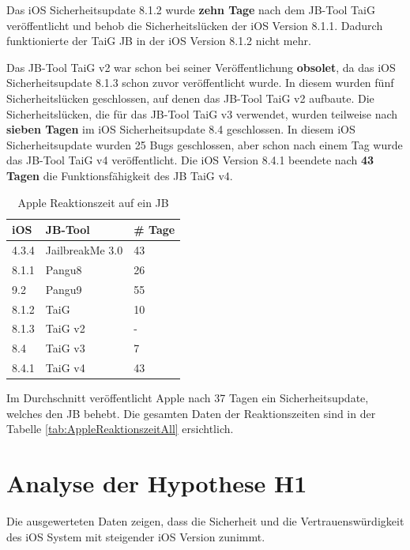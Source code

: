 Das iOS Sicherheitsupdate 8.1.2 wurde \textbf{zehn Tage} nach dem JB-Tool TaiG veröffentlicht und behob die Sicherheitslücken der iOS Version 8.1.1. Dadurch funktionierte der TaiG JB in der iOS Version 8.1.2 nicht mehr.

Das JB-Tool TaiG v2 war schon bei seiner Veröffentlichung \textbf{obsolet}, da das iOS Sicherheitsupdate 8.1.3 schon zuvor veröffentlicht wurde. In diesem wurden fünf Sicherheitslücken geschlossen, auf denen das JB-Tool TaiG v2 aufbaute.
Die Sicherheitslücken, die für das JB-Tool TaiG v3 verwendet, wurden teilweise nach \textbf{sieben Tagen} im iOS Sicherheitsupdate 8.4 geschlossen. In diesem iOS Sicherheitsupdate wurden 25 Bugs geschlossen, aber schon nach einem Tag wurde das JB-Tool TaiG v4 veröffentlicht. Die iOS Version 8.4.1 beendete nach \textbf{43 Tagen} die Funktionsfähigkeit des JB TaiG v4.

\begin{table}[htp!]
    \begin{center}
        \begin{tabular}{| p{10mm} | p{40mm} | p{17mm} |} \hline
            \textbf{iOS} & \textbf{JB-Tool} & \textbf{\# Tage} \\ \hline 
                4.3.4 & JailbreakMe 3.0 & 43 \\ \hline
                8.1.1 & Pangu8 & 26 \\ \hline
                9.2 & Pangu9 & 55 \\ \hline
                8.1.2 & TaiG & 10  \\ \hline
                 8.1.3 & TaiG v2 & - \\ \hline
                  8.4 & TaiG v3 & 7  \\ \hline
                  8.4.1 & TaiG v4 & 43  \\ \hline
        \end{tabular} 
        \caption{Apple Reaktionszeit auf ein JB}
        \label{tab:AppleReaktionszeit}
    \end{center}
\end{table}
Im Durchschnitt veröffentlicht Apple nach 37 Tagen ein Sicherheitsupdate, welches den JB behebt. Die gesamten Daten der Reaktionszeiten sind in der Tabelle \ref{tab:AppleReaktionszeitAll} ersichtlich.  

\section{Analyse der Hypothese H1}
\label{sec:AnalyseHypo}
Die ausgewerteten Daten zeigen, dass die Sicherheit und die Vertrauenswürdigkeit des iOS System mit steigender iOS Version zunimmt. 

